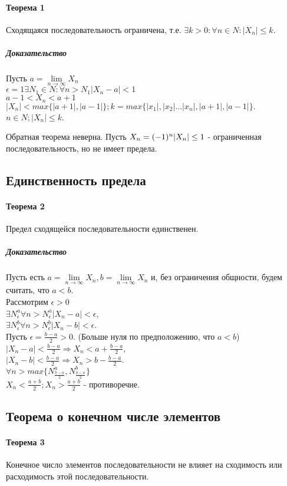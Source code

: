 \documentclass[10pt]{article}
\newcommand{\limninf}{\lim\limits_{n \to \infty}}
\begin{document}
			\paragraph{Теорема 1} Сходящаяся последовательность ограничена, т.е. $\exists k > 0 : \forall n \in N : |X_n| \le k$.
			\subparagraph{Доказательство}
			Пусть $a = \limninf X_n$ \\
			$\epsilon = 1 \exists N_1 \in N : \forall n > N_1 | X_n - a| < 1$\\
			$a - 1 < X_n < a + 1$\\
			$|X_n| < max\{|a+1|, |a-1|\}; k = max\{|x_1|,|x_2|\dots|x_n|,|a+1|,|a-1|\}.$\\
			$n \in N; |X_n| \le k$.
			
			Обратная теорема неверна. Пусть $X_n = (-1)^n\\|X_n| \le 1$ - ограниченная последовательность, но не имеет предела.
		\subsection{Единственность предела}
			\paragraph{Теорема 2}
			Предел сходящейся последовательности единственен.
			\subparagraph{Доказательство}
			Пусть есть $a = \limninf X_n, b = \limninf X_n$ и, без ограничения общности, будем считать, что $a < b$.\\
			Рассмотрим $\epsilon > 0$\\
			$\exists N_\epsilon^a \forall n > N_\epsilon^a |X_n - a| < \epsilon$,\\
			$\exists N_\epsilon^b \forall n > N_\epsilon^b |X_n - b| < \epsilon$.\\
			Пусть $\epsilon = \frac{b-a}{2} > 0$. (Больше нуля по предположению, что $a < b$)\\
			$|X_n - a| < \frac{b - a}{2} \Rightarrow X_n < a + \frac{b-a}{2}$,\\
			$|X_n - b| < \frac{b-a}{2} \Rightarrow X_n > b - \frac{b-a}{2}$.\\
			$\forall n > max\{N_{\frac{b-a}{2}}^a, N_{\frac{b-a}{2}}^b\}$\\
			$X_n < \frac{a+b}{2}; X_n > \frac{a+b}{2}$ - противоречие.
		\subsection{Теорема о конечном числе элементов}
			\paragraph{Теорема 3}
			Конечное число элементов последовательности не влияет на сходимость или расходимость этой последовательности.
			
\end{document}
